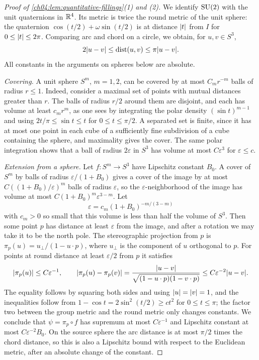 \begin{proof}[Proof of \cref{ch04:lem:quantitative-fillings}(1) and (2)]
We identify $\mathrm{SU}(2)$ with the unit quaternions in $\mathbb R^4$. Its metric is twice the round metric of the unit sphere: the quaternion $\cos(t/2)+\omega\sin(t/2)$ is at distance $\lvert t\rvert$ from $I$ for $0\le\lvert t\rvert\le2\pi$. Comparing arc and chord on a circle, we obtain, for $u,v\in S^3$,
\begin{equation}\label{ch04:eq:chord-comparison}
 2\lvert u-v\rvert\le\operatorname{dist}(u,v)\le\pi\lvert u-v\rvert.
\end{equation}
All constants in the arguments on spheres below are absolute.

\emph{Covering.} A unit sphere $S^m$, $m=1,2$, can be covered by at most $C_mr^{-m}$ balls of radius $r\le1$. Indeed, consider a maximal set of points with mutual distances greater than $r$. The balls of radius $r/2$ around them are disjoint, and each has volume at least $c_mr^m$, as one sees by integrating the polar density $(\sin t)^{m-1}$ and using $2t/\pi\le\sin t\le t$ for $0\le t\le\pi/2$. A separated set is finite, since it has at most one point in each cube of a sufficiently fine subdivision of a cube containing the sphere, and maximality gives the cover. The same polar integration shows that a ball of radius $2\varepsilon$ in $S^3$ has volume at most $C\varepsilon^3$ for $\varepsilon\le c$.

\emph{Extension from a sphere.} Let $f:S^m\to S^3$ have Lipschitz constant $B_0$. A cover of $S^m$ by balls of radius $\varepsilon/(1+B_0)$ gives a cover of the image by at most $C((1+B_0)/\varepsilon)^m$ balls of radius $\varepsilon$, so the $\varepsilon$-neighborhood of the image has volume at most $C(1+B_0)^m\varepsilon^{3-m}$. Let
\[
 \varepsilon=c_m(1+B_0)^{-m/(3-m)}
\]
with $c_m>0$ so small that this volume is less than half the volume of $S^3$. Then some point $p$ has distance at least $\varepsilon$ from the image, and after a rotation we may take it to be the north pole. The stereographic projection from $p$ is $\pi_p(u)=u_\perp/(1-u\cdot p)$, where $u_\perp$ is the component of $u$ orthogonal to $p$. For points at round distance at least $\varepsilon/2$ from $p$ it satisfies
\begin{equation}\label{ch04:eq:stereo-bounds}
 \lvert \pi_p(u)\rvert\le C\varepsilon^{-1},\qquad\lvert \pi_p(u)-\pi_p(v)\rvert=\frac{\lvert u-v\rvert}{\sqrt{(1-u\cdot p)(1-v\cdot p)}}\le C\varepsilon^{-2}\lvert u-v\rvert.
\end{equation}
The equality follows by squaring both sides and using $\lvert u\rvert=\lvert v\rvert=1$, and the inequalities follow from $1-\cos t=2\sin^2(t/2)\ge ct^2$ for $0\le t\le\pi$; the factor two between the group metric and the round metric only changes constants. We conclude that $\psi=\pi_p\circ f$ has supremum at most $C\varepsilon^{-1}$ and Lipschitz constant at most $C\varepsilon^{-2}B_0$. On the source sphere the arc distance is at most $\pi/2$ times the chord distance, so this is also a Lipschitz bound with respect to the Euclidean metric, after an absolute change of the constant.


\end{proof}
